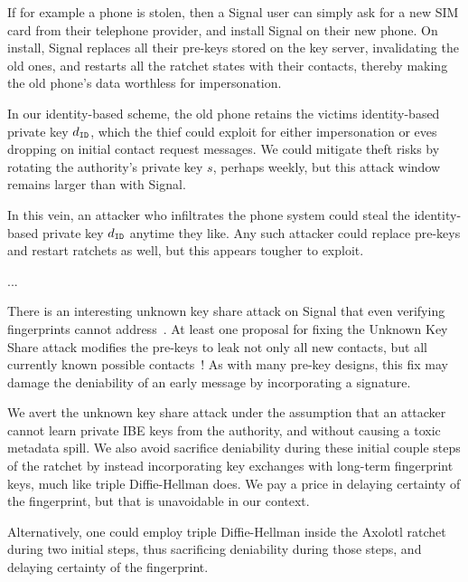 \documentclass[twoside,letterpaper]{sig-alternate}
\begin{document}
If for example a phone is stolen, then a Signal user can simply ask
for a new SIM card from their telephone provider, and install Signal
on their new phone.  On install, Signal replaces all their pre-keys 
stored on the key server, invalidating the old ones, and restarts all
the ratchet states with their contacts, thereby making the old phone's
data worthless for impersonation. 

In our identity-based scheme, the old phone retains the victims
identity-based private key $d_{\mathtt{ID}}$, which the thief could exploit for
either impersonation or eves dropping on initial contact request messages.
We could mitigate theft risks by rotating the authority's private key $s$,
perhaps weekly, but this attack window remains larger than with Signal.

In this vein, an attacker who infiltrates the phone system could steal
the identity-based private key $d_{\mathtt{ID}}$ anytime they like.  
Any such attacker could replace pre-keys and restart ratchets as well,
but this appears tougher to exploit.

\smallskip


\smallskip

...

There is an interesting unknown key share attack on Signal that
even verifying fingerprints cannot address~\cite[\S4.2]{TextSecure}.
At least one proposal for fixing the Unknown Key Share attack
modifies the pre-keys to leak not only all new contacts, but
all currently known possible contacts~\cite[\S4.3]{TextSecure}! 
As with many pre-key designs, this fix may damage the deniability
 of an early message by incorporating a signature.

We avert the unknown key share attack under the assumption that
an attacker cannot learn private IBE keys from the authority, and
 without causing a toxic metadata spill.
We also avoid sacrifice deniability during these initial couple steps of
the ratchet by instead incorporating key exchanges with long-term
fingerprint keys, much like triple Diffie-Hellman does.
We pay a price in delaying certainty of the fingerprint, but
 that is unavoidable in our context.


Alternatively, one could employ triple Diffie-Hellman inside the
Axolotl ratchet during two initial steps,
 thus sacrificing deniability during those steps,
 and delaying certainty of the fingerprint. 
\end{document}
